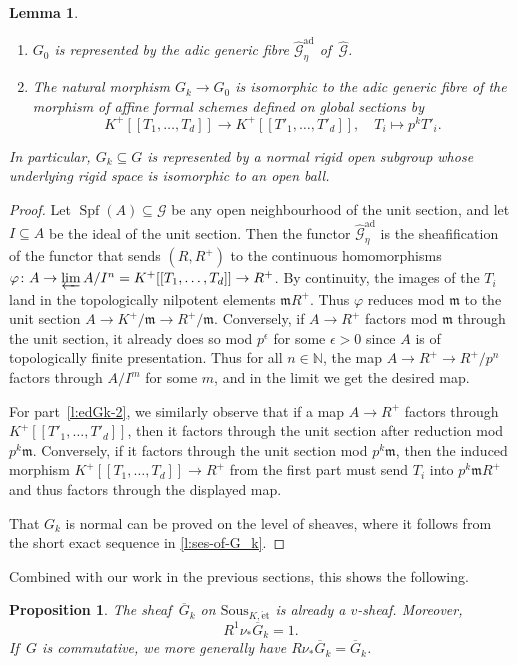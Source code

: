 \documentclass[11pt]{amsart}
\numberwithin{equation}{section}
\newtheorem{Lemma}[thm]{Lemma}
\newtheorem{Proposition}[thm]{Proposition}
\theoremstyle{definition}
\theoremstyle{remark}
\newcommand{\lra}{\longrightarrow}
\newcommand{\wh}{\widehat}
\newcommand{\N}{\mathbb{N}}
\newcommand{\m}{\mathfrak{m}}
\newcommand{\et}{{\operatorname{\acute{e}t}}}
\newcommand{\ad}{\mathrm{ad}}
\newcommand{\Spf}{\operatorname{Spf}}
\newcommand{\mG}{\mathcal{G}}
\newcommand{\Sous}{\mathrm{Sous}}
\begin{document}
\begin{Lemma}\label{l:explicit-description-of-G_k}\leavevmode
	\begin{enumerate}
		\item $G_0$ is represented by the adic generic fibre  $\wh{\mG}^{\ad}_{\eta}$ of\, $\wh{\mG}$.
		\item\label{l:edGk-2} The natural morphism $G_k\to G_0$ is isomorphic to the adic generic fibre of the morphism of affine formal schemes defined on global sections by
		\[ K^+[[T_1,\dots,T_d]]\lra K^+[[T'_1,\dots,T'_d]],\quad T_i\longmapsto p^kT'_i.\]
	\end{enumerate}
	In particular, $G_k\subseteq G$ is represented by a normal rigid open subgroup whose underlying rigid space is isomorphic to an open ball.
\end{Lemma}

\begin{proof}
	Let $\Spf(A)\subseteq \mG$ be any open neighbourhood of the unit section, and let $I\subseteq A$ be the ideal of the unit section. Then the functor $\wh{\mG}^{\ad}_{\eta}$ is the sheafification of the functor that sends  $(R,R^+)$ to the continuous homomorphisms $\varphi\colon A\to \varprojlim A/I^n=K^+[[T_1,\dots,T_d]]\to R^+$. By continuity, the images of the $T_i$ land in the topologically nilpotent elements $\m R^+$. Thus $\varphi$ reduces mod $\m$ to the unit section $A\to K^+/\m \to R^+/\m$. Conversely, if $A\to R^+$ factors mod $\m$ through the unit section, it already does so mod $p^{\epsilon}$ for some $\epsilon>0$ since $A$ is of topologically finite presentation. Thus for all $n\in \N$, the map $A\to R^+\to R^+/p^n$ factors through $A/I^m$ for some $m$, and in the limit we get the desired map.
	
	For part~\eqref{l:edGk-2}, we similarly observe that if a map $A\to R^+$ factors through $K^+[[T'_1,\dots,T'_d]]$, then it factors through the unit section after reduction mod $p^k\m$. Conversely, if it factors through the unit section mod $p^k\m$, then the induced morphism $K^+[[T_1,\dots,T_d]]\to R^+$ from the first part must send $T_i$ into $p^k\m R^+$ and thus factors through the displayed map.
	
	That $G_k$ is normal can be proved on the level of sheaves, where it follows from the short exact sequence in \cref{l:ses-of-G_k}.
\end{proof}

Combined with our work in the previous sections, this shows the following. 

\begin{Proposition}\label{l:cohomo-comp-G^+/G^+_c}
	The sheaf\, $\overline G_{k}$ on $\Sous_{K,\et}$ is already a $v$-sheaf. Moreover,
	\[ R^1\nu_{\ast}\overline G_k=1.\]
	If\, $G$ is commutative,  we more generally have $R\nu_{\ast}\overline G_{k}=\overline G_{k}$.
\end{Proposition}
\end{document}
